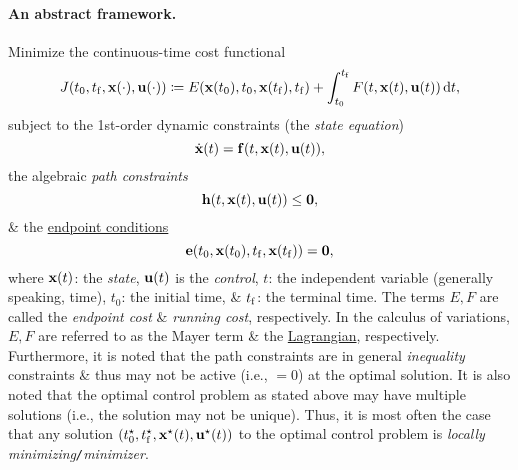 \documentclass{article}
\begin{document}
\paragraph{An abstract framework.} Minimize the continuous-time cost functional
\begin{equation}
	J(t_0,t_{\rm f},{\bf x}(\cdot),{\bf u}(\cdot))\coloneqq E({\bf x}(t_0),t_0,{\bf x}(t_{\rm f}),t_{\rm f}) + \int_{t_0}^{t_{\rm f}} F(t,{\bf x}(t),{\bf u}(t))\,{\rm d}t,
\end{equation}
subject to the 1st-order dynamic constraints (the {\it state equation})
\begin{equation}
	\dot{\bf x}(t) = {\bf f}(t,{\bf x}(t),{\bf u}(t)),
\end{equation}
the algebraic {\it path constraints}
\begin{equation}
	{\bf h}(t,{\bf x}(t),{\bf u}(t))\le{\bf 0},
\end{equation}
\& the \href{https://en.wikipedia.org/wiki/Boundary_condition}{endpoint conditions}
\begin{equation}
	{\bf e}(t_0,{\bf x}(t_0),t_{\rm f},{\bf x}(t_{\rm f})) = {\bf 0},
\end{equation}
where ${\bf x}(t)$: the {\it state}, ${\bf u}(t)$ is the {\it control}, $t$: the independent variable (generally speaking, time), $t_0$: the initial time, \& $t_{\rm f}$: the terminal time. The terms $E,F$ are called the {\it endpoint cost} \& {\it running cost}, respectively. In the calculus of variations, $E,F$ are referred to as the Mayer term \& the \href{https://en.wikipedia.org/wiki/Lagrange_multiplier}{Lagrangian}, respectively. Furthermore, it is noted that the path constraints are in general {\it inequality} constraints \& thus may not be active (i.e., $= 0$) at the optimal solution. It is also noted that the optimal control problem as stated above may have multiple solutions (i.e., the solution may not be unique). Thus, it is most often the case that any solution $(t_0^\star,t_{\rm f}^\star,{\bf x}^\star(t),{\bf u}^\star(t))$ to the optimal control problem is {\it locally minimizing{\tt/}minimizer}.
\end{document}
